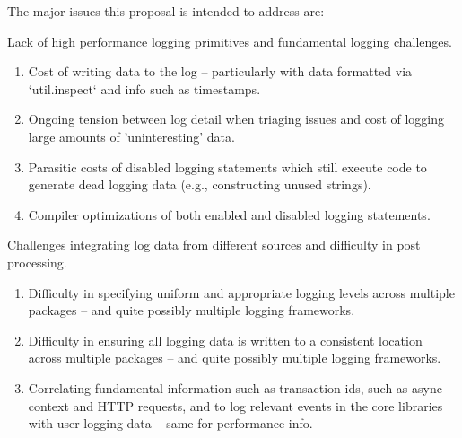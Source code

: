 
The major issues this proposal is intended to address are:

\noindent
Lack of high performance logging primitives and fundamental logging challenges.
\begin{enumerate}
 \item Cost of writing data to the log -- particularly with data formatted via 
    `util.inspect` and info such as timestamps.
 \item Ongoing tension between log detail when triaging issues and cost of logging 
    large amounts of 'uninteresting' data.
\item Parasitic costs of disabled logging statements which still execute code to 
    generate dead logging data (e.g., constructing unused strings).
\item Compiler optimizations of both enabled and disabled logging statements.
\end{enumerate}

\noindent
Challenges integrating log data from different sources and difficulty in post processing.
\begin{enumerate}
\item Difficulty in specifying uniform and appropriate logging levels across 
    multiple packages -- and quite possibly multiple logging frameworks.
\item Difficulty in ensuring all logging data is written to a consistent location 
    across multiple packages -- and quite possibly multiple logging frameworks.
\item Correlating fundamental information such as  
    transaction ids, such as async context and HTTP requests, and to log relevant 
    events in the core libraries with user logging data -- same for performance info.
\end{enumerate}

